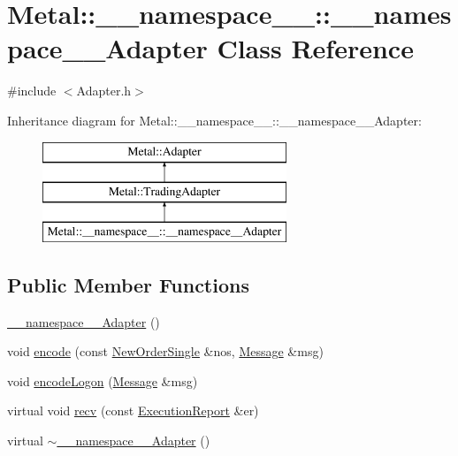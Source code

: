 \hypertarget{classMetal_1_1____namespace_____1_1____namespace____Adapter}{}\section{Metal\+:\+:\+\_\+\+\_\+namespace\+\_\+\+\_\+\+:\+:\+\_\+\+\_\+namespace\+\_\+\+\_\+\+Adapter Class Reference}
\label{classMetal_1_1____namespace_____1_1____namespace____Adapter}


{\ttfamily \#include $<$Adapter.\+h$>$}

Inheritance diagram for Metal\+:\+:\+\_\+\+\_\+namespace\+\_\+\+\_\+\+:\+:\+\_\+\+\_\+namespace\+\_\+\+\_\+\+Adapter\+:\begin{figure}[H]
\begin{center}
\leavevmode
\includegraphics[height=3.000000cm]{classMetal_1_1____namespace_____1_1____namespace____Adapter}
\end{center}
\end{figure}
\subsection*{Public Member Functions}
\begin{DoxyCompactItemize}
\item 
\hyperlink{classMetal_1_1____namespace_____1_1____namespace____Adapter_a07bd9b16659c63af69f648c352633b75}{\+\_\+\+\_\+namespace\+\_\+\+\_\+\+Adapter} ()
\item 
void \hyperlink{classMetal_1_1____namespace_____1_1____namespace____Adapter_a548b5d6aca37c3c820864b09700f4881}{encode} (const \hyperlink{classMetal_1_1NewOrderSingle}{New\+Order\+Single} \&nos, \hyperlink{classMetal_1_1Message}{Message} \&msg)
\item 
void \hyperlink{classMetal_1_1____namespace_____1_1____namespace____Adapter_a7026ff1a9cc746ed533e460461e126c4}{encode\+Logon} (\hyperlink{classMetal_1_1Message}{Message} \&msg)
\item 
virtual void \hyperlink{classMetal_1_1____namespace_____1_1____namespace____Adapter_aaeb81b10fe915d3d489dc84f01dd5587}{recv} (const \hyperlink{namespaceMetal_af4294c176f6aecf9f75e9b106b117aa1}{Execution\+Report} \&er)
\item 
virtual \hyperlink{classMetal_1_1____namespace_____1_1____namespace____Adapter_a8dfb7440ac44e4fbf0e28ffe9af9da2a}{$\sim$\+\_\+\+\_\+namespace\+\_\+\+\_\+\+Adapter} ()
\end{DoxyCompactItemize}
